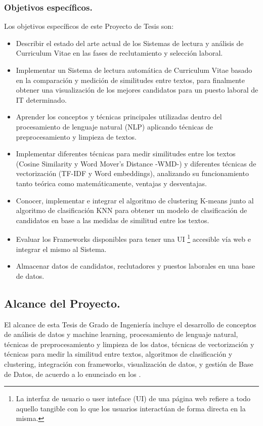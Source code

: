 \documentclass[12pt,a4paper]{article}
\begin{document}
\begin{sloppypar}
\subsubsection{Objetivos específicos.}\label{Obj_especif}
Los objetivos específicos de este Proyecto de Tesis son:
\begin{itemize}
\item Describir el estado del arte actual de los Sistemas de lectura y análisis de Curriculum Vitae en las fases de reclutamiento y selección laboral. 
\item Implementar un Sistema de lectura automática de Curriculum Vitae basado en la comparación y medición de similitudes entre textos, para finalmente obtener una visualización de los mejores candidatos para un puesto laboral de IT determinado.  
\item Aprender los conceptos y técnicas principales utilizadas dentro del procesamiento de lenguaje natural (NLP) aplicando técnicas de preprocesamiento y limpieza de textos.
\item Implementar diferentes técnicas para medir similitudes entre los textos (Cosine Similarity y  Word Mover's Distance -WMD-) y diferentes técnicas de vectorización (TF-IDF y Word embeddings), analizando su funcionamiento tanto teórica como matemáticamente, ventajas y desventajas.
\item Conocer, implementar e integrar el algoritmo de clustering K-means junto al algoritmo de clasificación KNN para obtener un modelo de clasificación de candidatos en base a las medidas de similitud entre los textos.
\item Evaluar los Frameworks disponibles para tener una UI \footnote{La interfaz de usuario o user inteface (UI) de una página web refiere a todo aquello tangible con lo que los usuarios interactúan de forma directa en la misma.} accesible vía web e integrar el mismo al Sistema.
\item Almacenar datos de candidatos, reclutadores y puestos laborales en una base de datos.
\end{itemize} 

\cleardoublepage    %

\subsection{Alcance del Proyecto.}
El alcance de esta Tesis de Grado de Ingeniería incluye el desarrollo de conceptos de análisis de datos y machine learning, procesamiento de lenguaje natural, técnicas de preprocesamiento y limpieza de los datos, técnicas de vectorización y técnicas para medir la similitud entre textos, algoritmos de clasificación y clustering, integración con frameworks, visualización de datos, y gestión de Base de Datos, de acuerdo a lo enunciado en los \textit{}.


\end{sloppypar}
\end{document}
